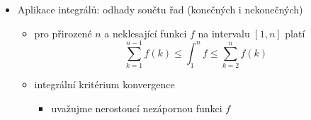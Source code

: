 \begin{itemize}
\begin{itemize}
\begin{itemize}
\item tzn. $a=a_0\lt a_1\lt a_2\lt \dots\lt a_k=b$
\end{itemize}
\item definujeme dolní Riemannovu sumu $s(f,D)=\sum_{i=0}^{k-1} |I_i|m_i$
\begin{itemize}
\item $I_i=[a_i,a_{i+1}]$
\item $m_i$ je infimum funkce $f$ v intervalu $I_i$
\end{itemize}
\item také definujeme horní Riemannovu sumu $S(f,D)=\sum_{i=0}^{k-1}|I_i|M_i$
\begin{itemize}
\item $M_i$ \dots{} supremum
\end{itemize}
\item dolní Riemannův integrál na intervalu $[a,b]$ definujeme jako supremum z $s(f,D)$ pro všechna dělení $D$ intervalu $[a,b]$
\begin{itemize}
\item značí se $\underline{\int_a^b f}$
\end{itemize}
\item horní Riemannův integrál je infimum z $S(f,D)$
\begin{itemize}
\item $\overline{\int_a^bf}$
\end{itemize}
\item funkce má Riemannův integrál, pokud se horní a dolní R. integrály rovnají (pak tuhle společnou hodnotu nazveme Riemannovým integrálem)
\begin{itemize}
\item $\int_a^b f$
\end{itemize}
\item 2\textbackslash{}. základní věta analýzy: pokud Riemannův a Newtonův integrál existují, pak jsou si rovny
\end{itemize}
\item Aplikace integrálů: odhady součtu řad (konečných i nekonečných)
\begin{itemize}
\item pro přirozené $n$ a neklesající funkci $f$ na intervalu $[1,n]$ platí \[\sum_{k=1}^{n-1}f(k)\leq\int_1^n f\leq\sum_{k=2}^n f(k)\]
\item integrální kritérium konvergence
\begin{itemize}
\item uvažujme nerostoucí nezápornou funkci $f$

\end{itemize}
\end{itemize}
\end{itemize}
